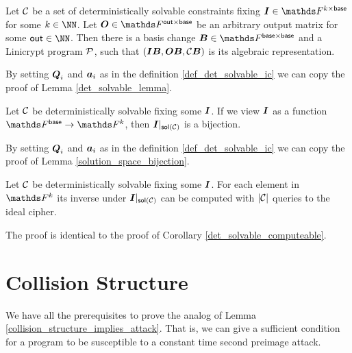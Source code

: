 \begin{lemma}
\label{det_solvable_lemma_ic}
    Let $\C$ be a set of deterministically solvable constraints fixing $\Inp \in \F^{k \times \base}$ for some $k \in \NN$.
    Let $\O \in \F^{\out \times \base}$ be an arbitrary output matrix for some $\out \in \NN$.
    Then there is a basis change $\B \in \F^{\base \times \base}$
    and a Linicrypt program $\P$,
    such that $(\Inp \B, \O \B, \C \B)$ is its algebraic representation.
\end{lemma}

\begin{sketch}
    By setting $\Q_i$ and $\va_i$ as in the definition \ref{def_det_solvable_ic} we can copy the proof of Lemma \ref{det_solvable_lemma}.
\end{sketch}

\begin{lemma}
\label{lemma:solution_space_bijection_ic}
    Let $\C$ be deterministically solvable fixing some $\I$.
    If we view $\I$ as a function $\Fsp \to \F^k$,
    then $\I|_{\sol(\C)}$ is a bijection.
\end{lemma}

\begin{sketch}
    By setting $\Q_i$ and $\va_i$ as in the definition \ref{def_det_solvable_ic} we can copy the proof of Lemma \ref{solution_space_bijection}.
\end{sketch}

\begin{corollary}
\label{corollary:det_solvable_computeable_ic}
    Let $\C$ be deterministically solvable fixing some $\I$.
    For each element in $\F^k$ its inverse under $\I|_{\sol(\C)}$ can be computed with $|\C|$ queries to the ideal cipher.
\end{corollary}

\begin{sketch}
    The proof is identical to the proof of Corollary \ref{det_solvable_computeable}.
\end{sketch}

\section{Collision Structure}

We have all the prerequisites to prove the analog of Lemma \ref{collision_structure_implies_attack}.
That is, we can give a sufficient condition for a program to be susceptible to a constant time second preimage attack.

